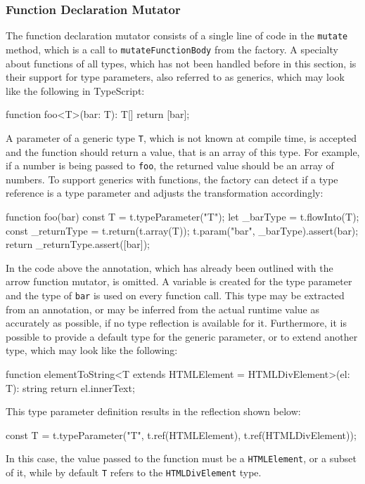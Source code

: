 \subsubsection{Function Declaration Mutator}

The function declaration mutator consists of a single line of code in the \texttt{mutate} method, which is a call to \texttt{mutateFunctionBody} from the factory. A specialty about functions of all types, which has not been handled before in this section, is their support for type parameters, also referred to as generics, which may look like the following in TypeScript:
\begin{JsCode}[numbers=none]
function foo<T>(bar: T): T[] {
  return [bar];
}
\end{JsCode}
A parameter of a generic type \texttt{T}, which is not known at compile time, is accepted and the function should return a value, that is an array of this type. For example, if a number is being passed to \texttt{foo}, the returned value should be an array of numbers. To support generics with functions, the factory can detect if a type reference is a type parameter and adjusts the transformation accordingly:
\begin{JsCode}[numbers=none]
function foo(bar) {
    const T = t.typeParameter("T");
    let _barType = t.flowInto(T);
    const _returnType = t.return(t.array(T));
    t.param("bar", _barType).assert(bar);
    return _returnType.assert([bar]);
}
\end{JsCode}
In the code above the annotation, which has already been outlined with the arrow function mutator, is omitted. A variable is created for the type parameter and the type of \texttt{bar} is used on every function call. This type may be extracted from an annotation, or may be inferred from the actual runtime value as accurately as possible, if no type reflection is available for it. Furthermore, it is possible to provide a default type for the generic parameter, or to extend another type, which may look like the following:
\begin{JsCode}[numbers=none]
function elementToString<T extends HTMLElement = HTMLDivElement>(el: T): string {
  return el.innerText;
}
\end{JsCode}
This type parameter definition results in the reflection shown below:
\begin{JsCode}[numbers=none]
const T = t.typeParameter("T", t.ref(HTMLElement), t.ref(HTMLDivElement));
\end{JsCode}
In this case, the value passed to the function must be a \texttt{HTMLElement}, or a subset of it, while by default \texttt{T} refers to the \texttt{HTMLDivElement} type.


